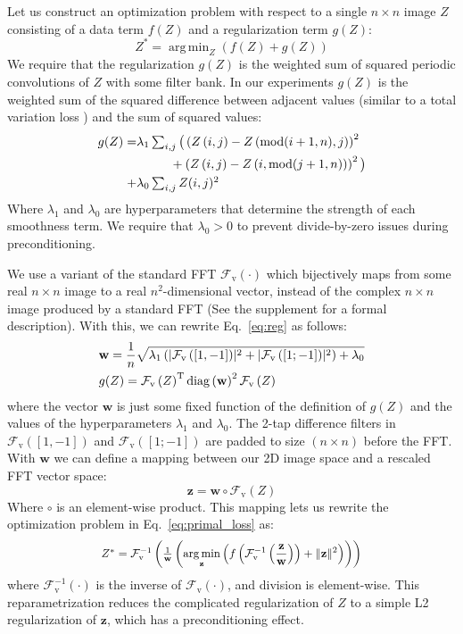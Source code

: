 \documentclass[10pt,twocolumn,letterpaper]{article}
\DeclarePairedDelimiter{\abs}{\lvert}{\rvert}
\DeclarePairedDelimiter{\norm}{\lVert}{\rVert}
\DeclareMathOperator{\diag}{diag}
\newcommand{\fftv}[1]{\mathcal{F}_\mathrm{v} \left( #1 \right)}
\newcommand{\ifftv}[1]{\mathcal{F}^{-1}_\mathrm{v} \left( #1 \right)}
\DeclareMathOperator*{\argmin}{arg\,min}
\begin{document}
Let us construct an optimization problem with respect to a single $n \times n$
image $Z$ consisting of a data term $f(Z)$ and a regularization term $g(Z)$:
\begin{equation}
Z^* = \argmin_Z \left( f\left(Z\right) + g\left(Z\right) \right)
\label{eq:primal_loss}
\end{equation}
We require that the regularization $g(Z)$
is the weighted sum of squared periodic convolutions of $Z$ with some filter bank.
In our experiments $g(Z)$ is the weighted
sum of the squared difference between adjacent values (similar to a total
variation loss \cite{Rudin1992}) and the sum of squared values:
\begin{align}
g(Z) = \textstyle & \lambda_1 \textstyle \sum_{i, j} \big( \left(Z \left(i,j \right) - Z \left(\operatorname{mod}(i+1, n),j \right) \right)^2 \nonumber \\
 & \quad\quad\,\,\,\, + \left( Z\left(i,j\right) - Z\left(i,\operatorname{mod}(j+1, n)\right) \right)^2 \big) \nonumber \\
 + & \lambda_0 \textstyle \sum_{i, j} Z(i,j)^2 \label{eq:reg}
\end{align}
Where $\lambda_1$ and $\lambda_0$ are hyperparameters that determine the
strength of each smoothness term. We require that $\lambda_0 > 0$ to prevent
divide-by-zero issues during preconditioning.

We use a variant of the standard FFT
$\fftv{\cdot}$ which bijectively maps from some real $n \times n$ image to a
real $n^2$-dimensional vector, instead of the complex $n \times n$ image
produced by a standard FFT (See the supplement for a formal description).
With this, we can rewrite Eq.~\ref{eq:reg} as follows:
\begin{align}
&\mathbf{w} = {1 \over n} \sqrt{ \lambda_1 \left( \abs{ \fftv{[1, -1]}}^2 + \abs{\fftv{[1; -1]}}^2 \right) + \lambda_0} \nonumber \\
&g(Z) = \fftv{Z}^\mathrm{T} \diag \left( \mathbf{w} \right)^2  \fftv{Z}
\end{align}
where the vector $\mathbf{w}$ is just some fixed function of the definition
of $g(Z)$ and the values of the hyperparameters $\lambda_1$ and $\lambda_0$.
The 2-tap difference filters in $\fftv{[1, -1]}$ and $\fftv{[1; -1]}$
are padded to size $(n \times n)$ before the FFT.
With $\mathbf{w}$ we can define a mapping between our 2D image space and
a rescaled FFT vector space:
\begin{equation}
\mathbf{z} = \mathbf{w} \circ \fftv{Z}
\end{equation}
Where $\circ$ is an element-wise product.
This mapping lets us rewrite the optimization problem in Eq.~\ref{eq:primal_loss} as:
\begin{equation}
\resizebox{2.9in}{!}{$
Z^* = \ifftv{ {1 \over \mathbf{w}} \left( \displaystyle \argmin_{\mathbf{z}} \left( f \left( \ifftv{ {\mathbf{z} \over \mathbf{w}}} \right) + \norm{\mathbf{z}}^2 \right)} \right)
\label{eq:fourier_loss}
$}
\end{equation}
where $\ifftv{\cdot}$ is the inverse of $\fftv{\cdot}$, and division is element-wise.
This reparametrization reduces the complicated regularization of $Z$
to a simple L2 regularization of $\mathbf{z}$, which has a preconditioning
effect.
\end{document}
